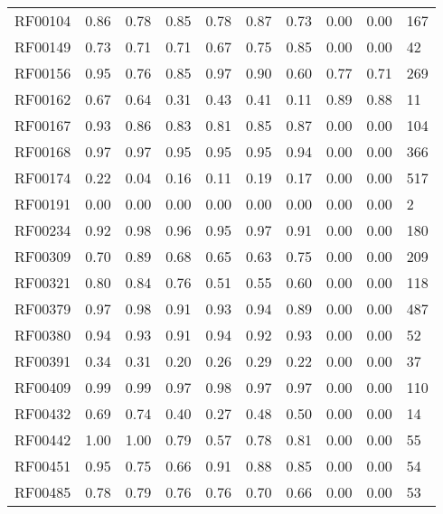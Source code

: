 \begin{tabular}{lrrrrrrrrl}
RF00104      &  0.86 &  0.78 &  0.85 &   0.78 &    0.87 &     0.73 &  0.00 & 0.00 &        167 \\
RF00149      &  0.73 &  0.71 &  0.71 &   0.67 &    0.75 &     0.85 &  0.00 & 0.00 &         42 \\
RF00156      &  0.95 &  0.76 &  0.85 &   0.97 &    0.90 &     0.60 &  0.77 & 0.71 &        269 \\
RF00162      &  0.67 &  0.64 &  0.31 &   0.43 &    0.41 &     0.11 &  0.89 & 0.88 &         11 \\
RF00167      &  0.93 &  0.86 &  0.83 &   0.81 &    0.85 &     0.87 &  0.00 & 0.00 &        104 \\
RF00168      &  0.97 &  0.97 &  0.95 &   0.95 &    0.95 &     0.94 &  0.00 & 0.00 &        366 \\
RF00174      &  0.22 &  0.04 &  0.16 &   0.11 &    0.19 &     0.17 &  0.00 & 0.00 &        517 \\
RF00191      &  0.00 &  0.00 &  0.00 &   0.00 &    0.00 &     0.00 &  0.00 & 0.00 &          2 \\
RF00234      &  0.92 &  0.98 &  0.96 &   0.95 &    0.97 &     0.91 &  0.00 & 0.00 &        180 \\
RF00309      &  0.70 &  0.89 &  0.68 &   0.65 &    0.63 &     0.75 &  0.00 & 0.00 &        209 \\
RF00321      &  0.80 &  0.84 &  0.76 &   0.51 &    0.55 &     0.60 &  0.00 & 0.00 &        118 \\
RF00379      &  0.97 &  0.98 &  0.91 &   0.93 &    0.94 &     0.89 &  0.00 & 0.00 &        487 \\
RF00380      &  0.94 &  0.93 &  0.91 &   0.94 &    0.92 &     0.93 &  0.00 & 0.00 &         52 \\
RF00391      &  0.34 &  0.31 &  0.20 &   0.26 &    0.29 &     0.22 &  0.00 & 0.00 &         37 \\
RF00409      &  0.99 &  0.99 &  0.97 &   0.98 &    0.97 &     0.97 &  0.00 & 0.00 &        110 \\
RF00432      &  0.69 &  0.74 &  0.40 &   0.27 &    0.48 &     0.50 &  0.00 & 0.00 &         14 \\
RF00442      &  1.00 &  1.00 &  0.79 &   0.57 &    0.78 &     0.81 &  0.00 & 0.00 &         55 \\
RF00451      &  0.95 &  0.75 &  0.66 &   0.91 &    0.88 &     0.85 &  0.00 & 0.00 &         54 \\
RF00485      &  0.78 &  0.79 &  0.76 &   0.76 &    0.70 &     0.66 &  0.00 & 0.00 &         53 \\

\end{tabular}
